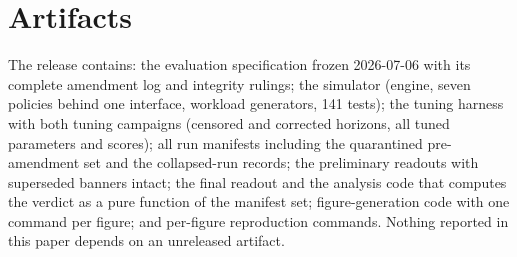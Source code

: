 \section*{Artifacts}

The release contains: the evaluation specification frozen 2026-07-06
with its complete amendment log and integrity rulings; the simulator
(engine, seven policies behind one interface, workload generators, 141
tests); the tuning harness with both tuning campaigns (censored and
corrected horizons, all tuned parameters and scores); all run manifests
including the quarantined pre-amendment set and the collapsed-run
records; the preliminary readouts with superseded banners intact; the
final readout and the analysis code that computes the verdict as a pure
function of the manifest set; figure-generation code with one command
per figure; and per-figure reproduction commands. \ArtifactStatement Nothing reported in this
paper depends on an unreleased artifact.
